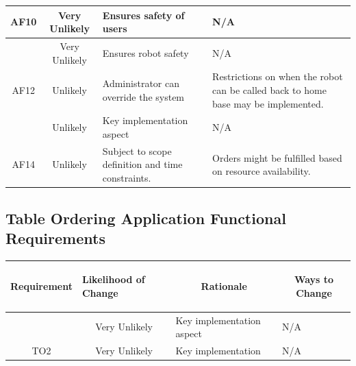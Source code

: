 \documentclass [11pt]{article}
\begin{document}
\begin{longtable}{| p{ } | p{ } |  p{ } | p{ } |}
\multicolumn{1}{|c|}{AF10}& 
\multicolumn{1}{|c|}{Very Unlikely} & Ensures safety of users & N/A \\ \hline

\rowcolor{tableCell} \multicolumn{1}{|c|}{AF11}& 
\multicolumn{1}{|c|}{Very Unlikely} & Ensures robot safety & N/A \\ \hline

\multicolumn{1}{|c|}{AF12}& 
\multicolumn{1}{|c|}{Unlikely} & Administrator can override the system & Restrictions on when the robot can be called back to home base may be implemented. \\ \hline

\rowcolor{tableCell} \multicolumn{1}{|c|}{AF13}& 
\multicolumn{1}{|c|}{Unlikely} & Key implementation aspect & N/A \\ \hline

\multicolumn{1}{|c|}{AF14}& 
\multicolumn{1}{|c|}{Unlikely} & Subject to scope definition and time constraints. & Orders might be fulfilled based on resource availability. \\ \hline
\end{longtable}

\subsection{Table Ordering Application Functional Requirements} 

\begin{longtable}{| p{ } | p{ } |  p{ } | p{ } |}\hline 
\multicolumn{1}{|c|}{\textbf {Requirement}} & 
\begin{minipage}{.14 \columnwidth}\begin{center}\vspace{1.5mm}\textbf{Likelihood of Change}   \vspace{1.5mm} \end{center}\end{minipage}& 
\multicolumn{1}{c|}{\textbf {Rationale}} & \multicolumn{1}{c|}{\textbf {Ways to Change}} \\ \hline

\rowcolor{tableCell} \multicolumn{1}{|c|}{TO1}& 
\multicolumn{1}{|c|}{Very Unlikely} & Key implementation aspect & N/A \\ \hline

\multicolumn{1}{|c|}{TO2}& 
\multicolumn{1}{|c|}{Very Unlikely} & Key implementation & N/A \\ \hline
\end{longtable}
\end{document}
